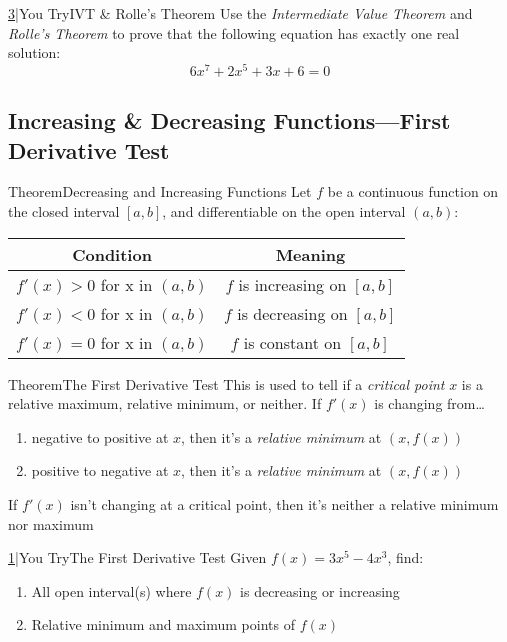 \documentclass{MathNotes}
\newenvironment{theorem}[1]{\begin{GrayBox}{Theorem}{#1}}{\end{GrayBox}}
\newenvironment{practice}[2]{\begin{PurpleBox}{\texorpdfstring{#1}\Big|You Try}{#2}}{\end{PurpleBox}}
\begin{document}
\begin{practice}{\hyperref[ans:ivt-rolles]{3}}{IVT \& Rolle's Theorem}\label{prac:ivt-rolles}
	Use the \textit{Intermediate Value Theorem} and \textit{Rolle's Theorem} to
	prove that the following equation has exactly one real solution:
    \[6x^7+2x^5+3x+6=0\]
\end{practice}

\newpage
\subsection{Increasing \& Decreasing Functions---First Derivative Test}\label{sec:first-derivative-test}

\begin{theorem}{Decreasing and Increasing Functions}\label{th:increasing-decreasing-functions}
	Let $f$ be a continuous function on the closed interval $[a, b]$, and
	differentiable on the open interval $(a, b)$:\newline
	\begin{center}
		\begin{tabular}{|c|c|}
			\hline
			Condition                   & Meaning                      \\
			\hline
			$f'(x)>0$ for x in $(a, b)$ & $f$ is increasing on $[a,b]$ \\
			$f'(x)<0$ for x in $(a, b)$ & $f$ is decreasing on $[a,b]$ \\
			$f'(x)=0$ for x in $(a, b)$ & $f$ is constant on $[a,b]$   \\
			\hline
		\end{tabular}
	\end{center}
\end{theorem}

\begin{theorem}{The First Derivative Test}\label{th:first-derivative-test}
	This is used to tell if a \textit{critical point} $x$ is a relative
	maximum, relative minimum, or neither. If $f'(x)$ is changing from\ldots

	\begin{enumerate}
		\item negative to positive at $x$, then it's a
		      \textit{relative minimum} at $(x, f(x))$
		\item positive to negative at $x$, then it's a
		      \textit{relative minimum} at $(x, f(x))$
	\end{enumerate}
	If $f'(x)$ isn't changing at a critical point, then it's neither a
	relative minimum nor maximum
\end{theorem}
\begin{practice}{\hyperref[ans:first-derivative-test]{1}}{The First Derivative Test}
	\label{prac:first-derivative-test}
	Given $\displaystyle f(x)=3x^5-4x^3$, find:
	\begin{enumerate}
		\item All open interval(s) where $f(x)$ is decreasing or increasing
		\item Relative minimum and maximum points of $f(x)$
	\end{enumerate}
\end{practice}
\end{document}
